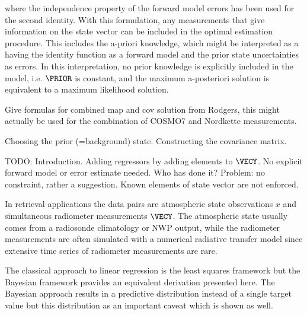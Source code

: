         where the independence property of the forward model errors has been
        used for the second identity. With this formulation, any measurements
        that give information on the state vector can be included in the
        optimal estimation procedure. This includes the a-priori knowledge,
        which might be interpreted as a  having
        the identity function as a forward model and the prior state
        uncertainties as errors. In this interpretation, no prior knowledge
        is explicitly included in the model, i.e. $\PRIOR$ is constant, and the
        maximum a-posteriori solution is equivalent to a maximum likelihood
        solution.

        Give formulas for combined map and cov solution from Rodgers, this
        might actually be used for the combination of COSMO7 and Nordkette
        measurements.
        
    \stopsubsection

    \startsubsection[title={Constructing the Prior},reference=ch:construct_prior]

        Choosing the prior (=background) state. Constructing the covariance
        matrix.

    \stopsubsection

\stopsection


\startsection[title={Linear Regression},reference=ch:linear_regression]

    TODO: Introduction. Adding regressors by adding elements to $\VECY$. No
    explicit forward model or error estimate needed.  Who has done it? Problem:
    no constraint, rather a suggestion. Known elements of state vector are not
    enforced.

    In retrieval applications the data pairs are atmospheric state observations
    $x$ and simultaneous radiometer measurements $\VECY$. The atmospheric state
    usually comes from a radiosonde climatology or NWP output, while the
    radiometer measurements are often simulated with a numerical radiative
    transfer model since extensive time series of radiometer measurements are
    rare.

    The classical approach to linear regression is the least squares framework
    but the Bayesian framework provides an equivalent derivation presented
    here. The Bayesian approach results in a predictive distribution instead
    of a single target value but this distribution as an important caveat which
    is shown as well.

